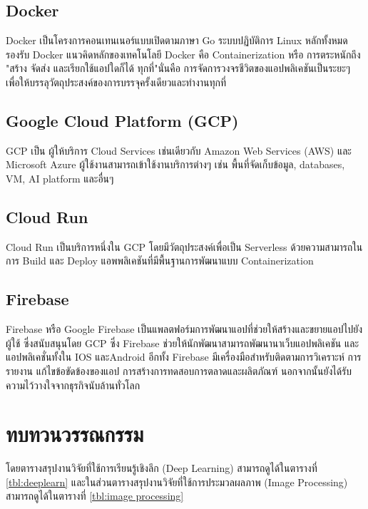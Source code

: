 \documentclass[12pt,oneside,openright,a4paper]{cpe-thai-project}
\begin{document}
\subsection{Docker}
Docker เป็นโครงการคอนเทนเนอร์แบบเปิดตามภาษา Go ระบบปฏิบัติการ Linux หลักทั้งหมดรองรับ Docker แนวคิดหลักของเทคโนโลยี Docker คือ Containerization หรือ การตระหนักถึง "สร้าง จัดส่ง และเรียกใช้แอปใดก็ได้ ทุกที่"นั่นคือ การจัดการวงจรชีวิตของแอปพลิเคชันเป็นระยะๆ เพื่อให้บรรลุวัตถุประสงค์ของการบรรจุครั้งเดียวและทํางานทุกที่ \cite{docker}

\subsection{Google Cloud Platform (GCP)}
GCP เป็น ผู้ให้บริการ Cloud Services เช่นเดียวกับ Amazon Web Services (AWS) และ Microsoft Azure ผู้ใช้งานสามารถเข้าใช้งานบริการต่างๆ เช่น พื้นที่จัดเก็บข้อมูล, databases, VM, AI platform และอื่นๆ \cite{googlecloudplatform}

\subsection{Cloud Run}
Cloud Run เป็นบริการหนึ่งใน GCP โดยมีวัตถุประสงค์เพื่อเป็น Serverless ด้วยความสามารถในการ Build และ Deploy แอพพลิเคชันที่มีพื้นฐานการพัฒนาแบบ Containerization \cite{cloudrun}

\subsection{Firebase}
Firebase หรือ Google Firebase เป็นแพลตฟอร์มการพัฒนาแอปที่ช่วยให้สร้างและขยายแอปไปยังผู้ใช้ ซึ่งสนับสนุนโดย GCP ซึ่ง Firebase ช่วยให้นักพัฒนาสามารถพัฒนานาเว็บแอปพลิเคชัน และแอปพลิเคชั่นทั้งใน IOS และAndroid อีกทั้ง Firebase มีเครื่องมือสําหรับติดตามการวิเคราะห์ การรายงาน แก้ไขข้อขัดข้องของแอป การสร้างการทดสอบการตลาดและผลิตภัณฑ์ นอกจากนั้นยังได้รับความไว้วางใจจากธุรกิจนับล้านทั่วโลก \cite{fb}
\pagebreak
\section{ทบทวนวรรณกรรม}
โดยตารางสรุปงานวิจัยที่ใช้การเรียนรู้เชิงลึก (Deep Learning) สามารถดูได้ในตารางที่ \ref{tbl:deeplearn} และในส่วนตารางสรุปงานวิจัยที่ใช้การประมวลผลภาพ (Image Processing) สามารถดูได้ในตารางที่ \ref{tbl:image processing}
\end{document}

